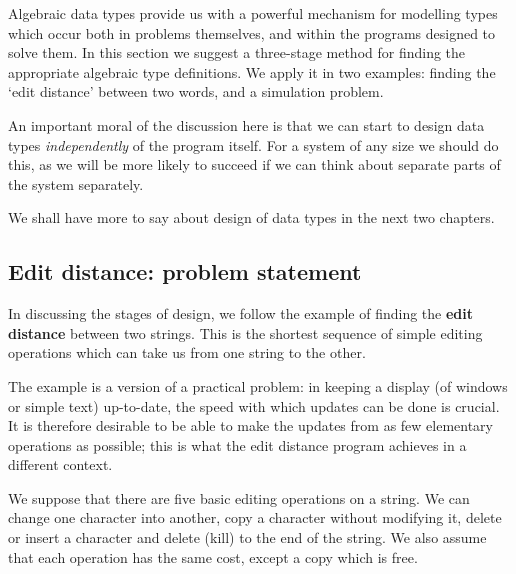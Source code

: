Algebraic data types provide us with a powerful mechanism for modelling types
which occur both in problems themselves, and within the programs
designed to solve them. In this section we suggest a three-stage method for
finding the appropriate algebraic type definitions. We apply it in two
examples: finding the `edit distance' between two words, and a simulation problem.

An important moral of the discussion here is that we can start to design
data types 
{\em independently\/} of the program itself. For a system of any size
we should do this, as we will be more likely to succeed if we can think about
separate parts of the system separately. 

We shall have more to say about design of data types in the next two chapters.

\subsection*{Edit distance: problem statement}

In discussing the stages of design, 
we follow the example of finding the \textbf{edit distance} between two
strings. This is the shortest sequence of simple editing operations which can
take us from one string to the other. 
 
The example is a version of a practical
problem: in keeping a display (of windows or simple text) up-to-date, the
speed with which updates can be done is crucial. It is therefore desirable to
be able to make the updates from as few elementary operations as possible;
this is what the edit distance program achieves in a different context.

We suppose that there are five basic editing operations on a string. We can
change one character into another, copy a character without modifying it,
delete or insert a character and delete (kill) to the end of the string. We
also assume that each operation has the same cost, except a copy which is
free. 

